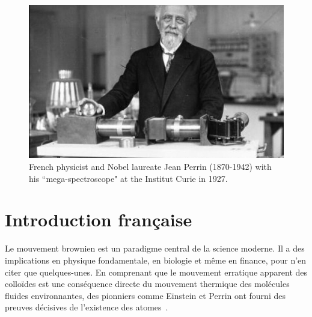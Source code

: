 \vspace{2cm}

\begin{figure}[h]
	\begin{center}
		\includegraphics[width=16cm]{02_body/introduction/image/perrin.jpg}
		\caption{French physicist and Nobel laureate Jean Perrin (1870-1942) with his ``mega-spectroscope" at the Institut Curie in 1927.}
	\end{center}
\end{figure}

\section{Introduction française}




Le mouvement brownien est un paradigme central de la science moderne. Il a des implications en physique fondamentale, en biologie et même en finance, pour n'en citer que quelques-unes. En comprenant que le mouvement erratique apparent des colloïdes est une conséquence directe du mouvement thermique des molécules fluides environnantes, des pionniers comme Einstein et Perrin ont fourni des preuves décisives de l'existence des atomes~\cite{einstein_uber_1905,perrin_les_2014}.

